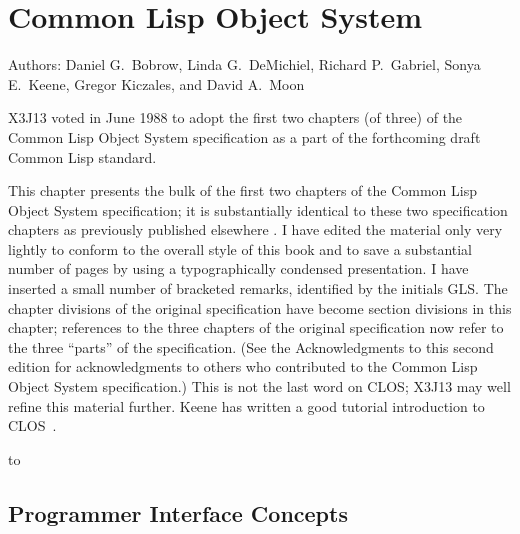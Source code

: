 
\clearpage\def\pagestatus{FINAL PROOF}



\ifx \rulang\Undef
  \def\CLOS{Common Lisp Object System}
  \def\OS{Object System}
\else %
  \def\CLOS{Объектная система Common Lisp'а}
  \def\OS{Объектная система}
\fi

\def\sub{_}

\chapter{Common Lisp Object System}
\label{CLOS}

Authors: Daniel G.~Bobrow, Linda G.~DeMichiel,
Richard P.~Gabriel, Sonya E.~Keene, Gregor Kiczales,
and David A.~Moon

\begin{new}
X3J13 voted in June 1988
to adopt the first two chapters (of three) of the
Common Lisp Object System specification
as a part of the forthcoming draft Common Lisp standard.
\end{new}

This chapter presents the bulk of the first two chapters of the
Common Lisp Object System specification; it is substantially
identical to these two specification chapters as previously published elsewhere
\cite{SIGPLAN-CLOS,LASC-CLOS-PART-1,LASC-CLOS-PART-2}.
I have edited the material only very lightly
to conform to the overall style of this book and to save a substantial
number of pages by using a typographically condensed presentation.
I have inserted a small
number of bracketed remarks, identified by the initials GLS.
The chapter divisions of the original specification have become
section divisions in this chapter; references to the three chapters
of the original specification now refer to the three ``parts'' of the
specification.
(See the Acknowledgments to this second edition for
acknowledgments to others who contributed to the Common Lisp Object System specification.)
This is not the last word on CLOS;
X3J13 may well refine this material further.
Keene has written a good tutorial introduction to CLOS~\cite{KEENE}.

\noindent\hbox to \textwidth{\hss---Guy L. Steele Jr.}

\section{Programmer Interface Concepts}

